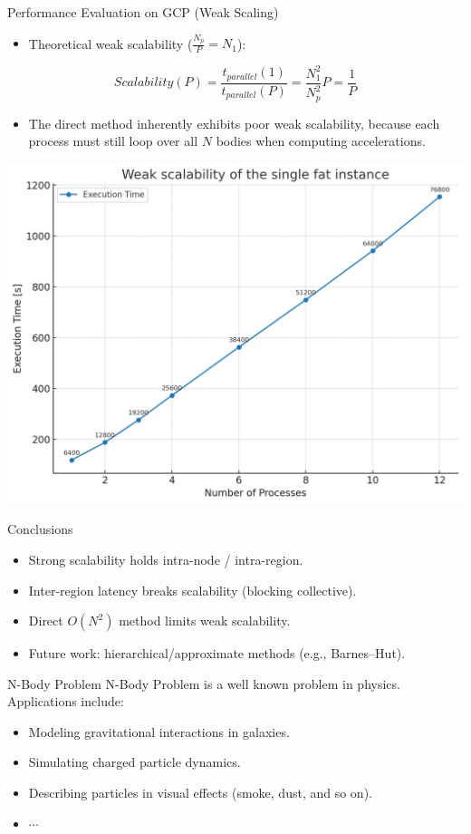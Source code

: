 \documentclass{beamer}
\begin{document}
\begin{frame}{Performance Evaluation on GCP (Weak Scaling)}
\begin{itemize}
	\item Theoretical weak scalability ($\tfrac{N_p}{P} = N_1$):
\end{itemize}
\[
Scalability(P) = \frac{t_{parallel}(1)}{t_{parallel}(P)} = \frac{N_1^2}{N_p^2}P = \frac{1}{P}
\]
\begin{itemize}
	\item The direct method inherently exhibits poor weak scalability, because each process must still loop over all $N$ bodies when computing accelerations.
\end{itemize}
  \centering
  \includegraphics[width=0.47\linewidth]{parallel_weak_scalability.png}
\end{frame}

\begin{frame}{Conclusions}
  \begin{itemize}
    \item Strong scalability holds intra-node / intra-region.
    \item Inter-region latency breaks scalability (blocking collective).
    \item Direct $O(N^2)$ method limits weak scalability.
    \item Future work: hierarchical/approximate methods (e.g., Barnes--Hut).
  \end{itemize}
\end{frame}















\begin{frame}{N-Body Problem}
N-Body Problem is a well known problem in physics. \\
Applications include:
\begin{itemize}
    \item Modeling gravitational interactions in galaxies.
    \item Simulating charged particle dynamics.
    \item Describing particles in visual effects (smoke, dust, and so on).
    \item $\cdots$
\end{itemize}
\end{frame}
\end{document}
